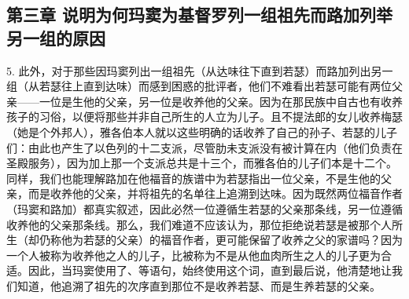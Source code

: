 \subsection{第三章 说明为何玛窦为基督罗列一组祖先而路加列举另一组的原因}

5. 此外，对于那些因玛窦列出一组祖先（从达味往下直到若瑟）而路加列出另一组（从若瑟往上直到达味）而感到困惑的批评者，他们不难看出若瑟可能有两位父亲——一位是生他的父亲，另一位是收养他的父亲。因为在那民族中自古也有收养孩子的习俗，以便将那些并非自己所生的人立为儿子。且不提法郎的女儿收养梅瑟（她是个外邦人），雅各伯本人就以这些明确的话收养了自己的孙子、若瑟的儿子们：由此也产生了以色列的十二支派，尽管肋未支派没有被计算在内（他们负责在圣殿服务），因为加上那一个支派总共是十三个，而雅各伯的儿子们本是十二个。同样，我们也能理解路加在他福音的族谱中为若瑟指出一位父亲，不是生他的父亲，而是收养他的父亲，并将祖先的名单往上追溯到达味。因为既然两位福音作者（玛窦和路加）都真实叙述，因此必然一位遵循生若瑟的父亲那条线，另一位遵循收养他的父亲那条线。那么，我们难道不应该认为，那位拒绝说若瑟是被那个人所生（却仍称他为若瑟的父亲）的福音作者，更可能保留了收养之父的家谱吗？因为一个人被称为收养他之人的儿子，比被称为不是从他血肉所生之人的儿子更为合适。因此，当玛窦使用了、等语句，始终使用这个词，直到最后说，他清楚地让我们知道，他追溯了祖先的次序直到那位不是收养若瑟、而是生养若瑟的父亲。\par

